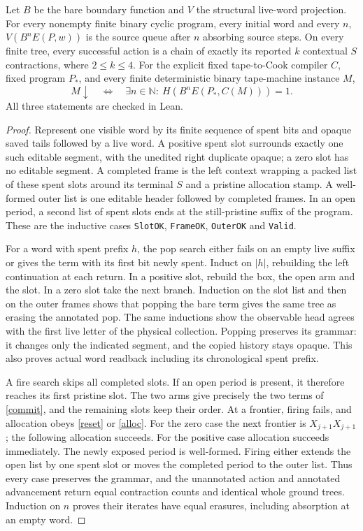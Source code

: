 \begin{theorem}\label{certmain}
Let \(B\) be the bare boundary function and \(V\) the structural live-word projection. For every nonempty finite binary cyclic program, every initial word and every \(n\), \(V(B^nE(P,w))\) is the source queue after \(n\) absorbing source steps. On every finite tree, every successful action is a chain of exactly its reported \(k\) contextual \(S\) contractions, where \(2\le k\le4\). For the explicit fixed tape-to-Cook compiler \(C\), fixed program \(P_*\), and every finite deterministic binary tape-machine instance \(M\),
\[
             M\downarrow\quad\Longleftrightarrow\quad
              \exists n\in\mathbb N:\ H\!\left(B^n E(P_*,C(M))\right)=1.
\]
All three statements are checked in Lean.
\end{theorem}
\begin{proof}
Represent one visible word by its finite sequence of spent bits and opaque saved tails followed by a live word. A positive spent slot surrounds exactly one such editable segment, with the unedited right duplicate opaque; a zero slot has no editable segment. A completed frame is the left context wrapping a packed list of these spent slots around its terminal \(S\) and a pristine allocation stamp. A well-formed outer list is one editable header followed by completed frames. In an open period, a second list of spent slots ends at the still-pristine suffix of the program. These are the inductive cases \texttt{SlotOK}, \texttt{FrameOK}, \texttt{OuterOK} and \texttt{Valid}.

For a word with spent prefix \(h\), the pop search either fails on an empty live suffix or gives the term with its first bit newly spent. Induct on \(|h|\), rebuilding the left continuation at each return. In a positive slot, rebuild the box, the open arm and the slot. In a zero slot take the next branch. Induction on the slot list and then on the outer frames shows that popping the bare term gives the same tree as erasing the annotated pop. The same inductions show the observable head agrees with the first live letter of the physical collection. Popping preserves its grammar: it changes only the indicated segment, and the copied history stays opaque. This also proves actual word readback including its chronological spent prefix.

A fire search skips all completed slots. If an open period is present, it therefore reaches its first pristine slot. The two arms give precisely the two terms of \eqref{commit}, and the remaining slots keep their order. At a frontier, firing fails, and allocation obeys \eqref{reset} or \eqref{alloc}. For the zero case the next frontier is \(X_{j+1}X_{j+1}\); the following allocation succeeds. For the positive case allocation succeeds immediately. The newly exposed period is well-formed. Firing either extends the open list by one spent slot or moves the completed period to the outer list. Thus every case preserves the grammar, and the unannotated action and annotated advancement return equal contraction counts and identical whole ground trees. Induction on \(n\) proves their iterates have equal erasures, including absorption at an empty word.


\end{proof}
